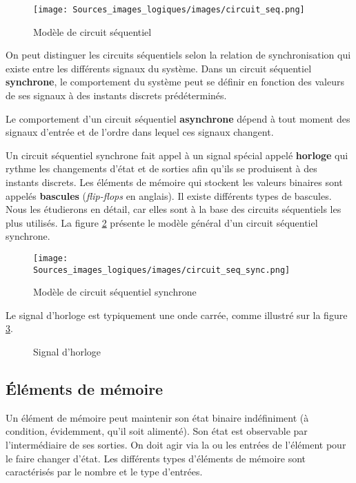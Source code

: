 \documentclass[11pt]{article}
\begin{document}
\begin{figure}[htbp]
\centering
\texttt{[image: Sources\_images\_logiques/images/circuit\_seq.png]}
\caption{\label{fig:orgabfaf2f}Modèle de circuit séquentiel}
\end{figure}

On peut distinguer les circuits séquentiels selon la relation de
synchronisation qui existe entre les différents signaux du
système. Dans un circuit séquentiel \textbf{synchrone}, le comportement du
système peut se définir en fonction des valeurs de ses signaux à des
instants discrets prédéterminés. 

Le comportement d'un circuit séquentiel \textbf{asynchrone} dépend à tout
moment des signaux d'entrée et de l'ordre dans lequel ces signaux
changent.

Un circuit séquentiel synchrone fait appel à un signal spécial appelé
\textbf{horloge} qui rythme les changements d'état et de sorties afin qu'ils se
produisent à des instants discrets. Les éléments de mémoire qui
stockent les valeurs binaires sont appelés \textbf{bascules} (\emph{flip-flops} en
anglais). Il existe différents types de bascules. Nous les étudierons
en détail, car elles sont à la base des circuits séquentiels les plus
utilisés. La figure \ref{fig:org24ba2ac} présente le modèle général d'un
circuit séquentiel synchrone.

\begin{figure}[htbp]
\centering
\texttt{[image: Sources\_images\_logiques/images/circuit\_seq\_sync.png]}
\caption{\label{fig:org24ba2ac}Modèle de circuit séquentiel synchrone}
\end{figure}

Le signal d'horloge est typiquement une onde carrée, comme illustré
sur la figure \ref{fig:org851b59f}.

\begin{figure}[htbp]
\centering

\caption{\label{fig:org851b59f}Signal d'horloge}
\end{figure}

\subsection{Éléments de mémoire}
\label{sec:org6751dfd}

Un élément de mémoire peut maintenir son état binaire indéfiniment (à
condition, évidemment, qu'il soit alimenté). Son état est observable
par l'intermédiaire de ses sorties. On doit agir via la ou les entrées
de l'élément pour le faire changer d'état. Les différents types
d'éléments de mémoire sont caractérisés par le nombre et le type
d'entrées.
\end{document}
